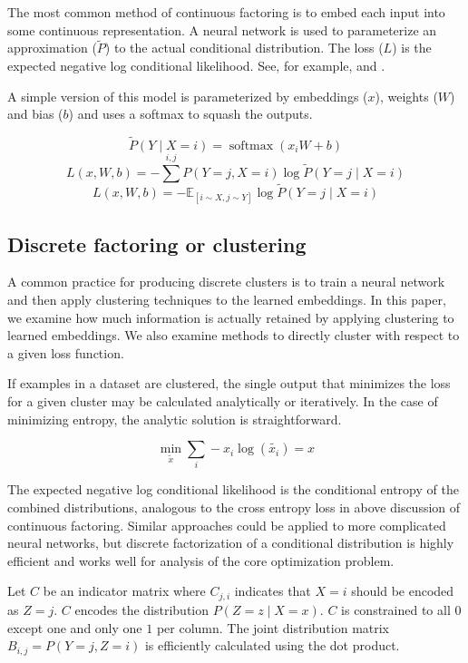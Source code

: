 \documentclass[11pt,letterpaper]{article}
\begin{document}
The most common method of continuous factoring is to embed each input into some continuous representation. A neural network is used to parameterize an approximation ($\tilde{P}$) to the actual conditional distribution. The loss ($L$) is the expected negative log conditional likelihood. See, for example, \cite{DBLP:journals/corr/MikolovSCCD13} and \cite{DBLP:journals/corr/abs-1301-3781}. 

A simple version of this model is parameterized by embeddings ($x$), weights ($W$) and bias ($b$) and uses a softmax to squash the outputs.

$$ \tilde{P}(Y\mid X=i) = \operatorname{softmax}(x_i W+b)$$
$$ L(x,W,b) = -\sum^{i, j} P(Y=j,X=i) \log \tilde{P}(Y=j \mid X=i) $$
$$ L(x,W,b) = -\mathbb{E}_{[i \sim X, j \sim Y]} \log \tilde{P}(Y=j \mid X=i) $$

\subsection{Discrete factoring or clustering}

A common practice for producing discrete clusters is to train a neural network and then apply clustering techniques to the learned embeddings. In this paper, we examine how much information is actually retained by applying clustering to learned embeddings. We also examine methods to directly cluster with respect to a given loss function.

If examples in a dataset are clustered, the single output that minimizes the loss for a given cluster may be calculated analytically or iteratively. In the case of minimizing entropy, the analytic solution is straightforward.

$$\min_{\tilde{x}}\sum_i-x_i \log(\tilde{x_i}) = x$$

The expected negative log conditional likelihood is the conditional entropy of the combined distributions, analogous to the cross entropy loss in above discussion of continuous factoring. Similar approaches could be applied to more complicated neural networks, but discrete factorization of a conditional distribution is highly efficient and works well for analysis of the core optimization problem.

Let $C$ be an indicator matrix where $C_{j,i}$ indicates that $X=i$ should be encoded as $Z=j$. $C$ encodes the distribution $P(Z=z \mid X=x)$. $C$ is constrained to all $0$ except one and only one $1$ per column. The joint distribution matrix $B_{i,j}=P(Y=j,Z=i)$ is efficiently calculated using the dot product. 
\end{document}
